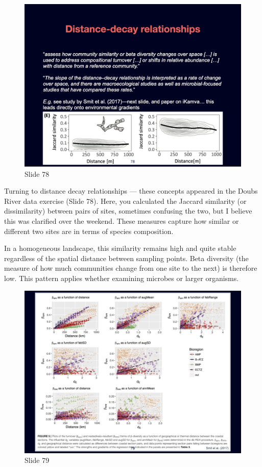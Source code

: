 \documentclass[
  10pt,
]{book}
\begin{document}
\begin{figure}[ht]
\centering
\includegraphics[width=0.8\linewidth]{../images/BDC334/BDC334-078.jpeg}
\caption*{Slide 78}
\end{figure}

Turning to distance decay relationships --- these concepts appeared in
the Doubs River data exercise (Slide 78). Here, you calculated the
Jaccard similarity (or dissimilarity) between pairs of sites, sometimes
confusing the two, but I believe this was clarified over the weekend.
These measures capture how similar or different two sites are in terms
of species composition.

In a homogeneous landscape, this similarity remains high and quite
stable regardless of the spatial distance between sampling points. Beta
diversity (the measure of how much communities change from one site to
the next) is therefore low. This pattern applies whether examining
microbes or larger organisms.

\begin{figure}[ht]
\centering
\includegraphics[width=0.8\linewidth]{../images/BDC334/BDC334-079.jpeg}
\caption*{Slide 79}
\end{figure}
\end{document}
